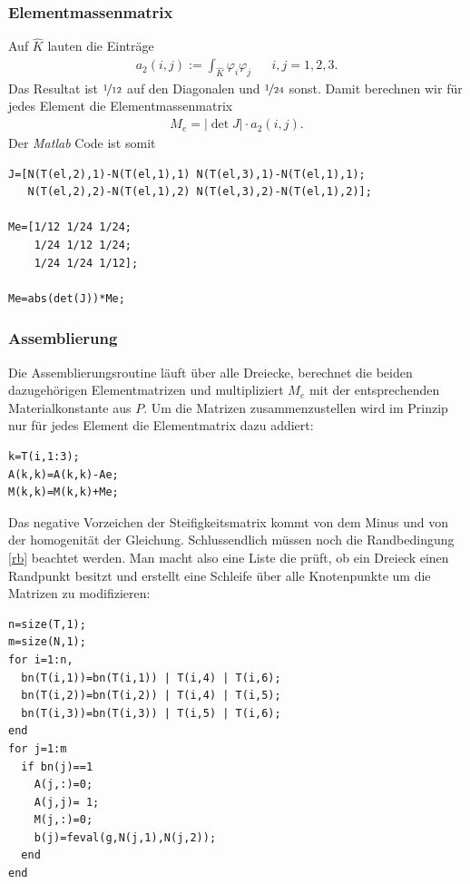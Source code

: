 \documentclass[ngerman,11pt,a4paper,titlepage]{article}
\begin{document}
\subsubsection*{Elementmassenmatrix}
Auf $\hat K$ lauten die Einträge
\begin{align*}
  a_2(i,j) := \int_{\hat K} \varphi_i \varphi_j && i,j=1,2,3.
\end{align*}
Das Resultat ist $\nicefrac{1}{12}$ auf den Diagonalen und $\nicefrac{1}{24}$ sonst. Damit berechnen wir für jedes Element die Elementmassenmatrix
\begin{align*}
  M_e = |\det{J}| \cdot a_2(i,j).
\end{align*}
Der \emph{Matlab} Code ist somit
\begin{lstlisting}
J=[N(T(el,2),1)-N(T(el,1),1) N(T(el,3),1)-N(T(el,1),1);
   N(T(el,2),2)-N(T(el,1),2) N(T(el,3),2)-N(T(el,1),2)];

Me=[1/12 1/24 1/24;
    1/24 1/12 1/24;
    1/24 1/24 1/12];

Me=abs(det(J))*Me;
\end{lstlisting}

\subsubsection*{Assemblierung}
Die Assemblierungsroutine läuft über alle Dreiecke, berechnet die beiden dazugehörigen Elementmatrizen und multipliziert $M_e$ mit der entsprechenden Materialkonstante aus $P$. Um die Matrizen zusammenzustellen wird im Prinzip nur für jedes Element die Elementmatrix dazu addiert:
\begin{lstlisting}
k=T(i,1:3);
A(k,k)=A(k,k)-Ae;
M(k,k)=M(k,k)+Me;
\end{lstlisting}
Das negative Vorzeichen der Steifigkeitsmatrix kommt von dem Minus und von der homogenität der Gleichung. Schlussendlich müssen noch die Randbedingung \eqref{rb} beachtet werden. Man macht also eine Liste die prüft, ob ein Dreieck einen Randpunkt besitzt und erstellt eine Schleife über alle Knotenpunkte um die Matrizen zu modifizieren:
\begin{lstlisting}
n=size(T,1);
m=size(N,1);
for i=1:n,
  bn(T(i,1))=bn(T(i,1)) | T(i,4) | T(i,6);
  bn(T(i,2))=bn(T(i,2)) | T(i,4) | T(i,5);
  bn(T(i,3))=bn(T(i,3)) | T(i,5) | T(i,6);
end
for j=1:m
  if bn(j)==1
    A(j,:)=0;
    A(j,j)= 1;
    M(j,:)=0;
    b(j)=feval(g,N(j,1),N(j,2));
  end
end
\end{lstlisting}
\end{document}
